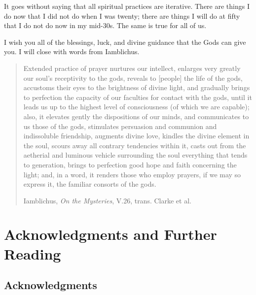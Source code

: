 \documentclass[
]{book}
\begin{document}
It goes without saying that all spiritual practices are iterative. There are things I do now that I did not do when I was twenty; there are things I will do at fifty that I do not do now in my mid-30s. The same is true for all of us.

I wish you all of the blessings, luck, and divine guidance that the Gods can give you. I will close with words from Iamblichus.

\begin{quote}
Extended practice of prayer nurtures our intellect, enlarges very greatly our soul's receptivity to the gods, reveals to {[}people{]} the life of the gods, accustoms their eyes to the brightness of divine light, and gradually brings to perfection the capacity of our faculties for contact with the gods, until it leads us up to the highest level of consciousness (of which we are capable); also, it elevates gently the dispositions of our minds, and communicates to us those of the gods, stimulates persuasion and communion and indissoluble friendship, augments divine love, kindles the divine element in the soul, scours away all contrary tendencies within it, casts out from the aetherial and luminous vehicle surrounding the soul everything that tends to generation, brings to perfection good hope and faith concerning the light; and, in a word, it renders those who employ prayers, if we may so express it, the familiar consorts of the gods.

Iamblichus, \emph{On the Mysteries}, V.26, trans. Clarke et al.
\end{quote}

\hypertarget{acknowledgments-and-further-reading}{%
\chapter{Acknowledgments and Further Reading}\label{acknowledgments-and-further-reading}}

\hypertarget{acknowledgments}{%
\section{Acknowledgments}\label{acknowledgments}}
\end{document}
